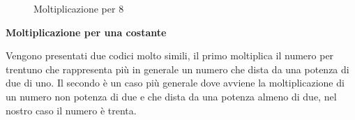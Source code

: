 \documentclass[12pt,a4paper]{report}
\begin{document}
 \begin{figure}
     \begin{subfigure}[b]{0.3\textwidth}
         
          	
		
		\label{Code:Mul8RISC}
     \end{subfigure}
     \hfill
     \begin{subfigure}[b]{0.3\textwidth}
         
          	

		\label{Code:Mul8ARM}
     \end{subfigure}
     \hfill
     \begin{subfigure}[b]{0.3\textwidth}
         
          	

		\label{Code:Mul8X86}
     \end{subfigure}
    
        \caption{Moltiplicazione per 8}
        \label{Fig:mult8}
\end{figure}

\vspace{0.3 cm}

\textbf{Moltiplicazione per una costante}

Vengono presentati due codici molto simili, il primo moltiplica il numero per trentuno che rappresenta più in generale un numero che dista da una potenza di due di uno. Il secondo è un caso più generale dove avviene la moltiplicazione di un numero non potenza di due e che dista da una potenza almeno di due, nel nostro caso il numero è trenta.

\vspace{0.2 cm }

\begin{figure}[h]
	\begin{subfigure}[b]{0.4\textwidth}
         
          	
		
     \end{subfigure}
     \hfill
     \begin{subfigure}[b]{0.4\textwidth}
         
          	
		
     \end{subfigure}
     
\end{figure}
\end{document}
